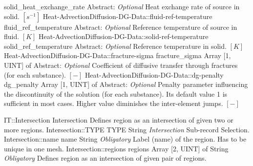 \begin{RecordType}
			{solid{\_}heat{\_}exchange{\_}rate}
			{{Abstract}{: }}
			{ \it{Optional} }
			{{{Heat exchange rate of source in solid. }{$[s^{-1}]$}}}
		\RecKey
			{Heat-AdvectionDiffusion-DG-Data::fluid-ref-temperature}
			{fluid{\_}ref{\_}temperature}
			{{Abstract}{: }}
			{ \it{Optional} }
			{{{Reference temperature of source in fluid. }{$[K]$}}}
		\RecKey
			{Heat-AdvectionDiffusion-DG-Data::solid-ref-temperature}
			{solid{\_}ref{\_}temperature}
			{{Abstract}{: }}
			{ \it{Optional} }
			{{{Reference temperature in solid. }{$[K]$}}}
		\RecKey
			{Heat-AdvectionDiffusion-DG-Data::fracture-sigma}
			{fracture{\_}sigma}
			{{Array [1, UINT] of }{Abstract}{: }}
			{ \it{Optional} }
			{{{Coefficient of diffusive transfer through fractures (for each substance). }{$[-]$}}}
		\RecKey
			{Heat-AdvectionDiffusion-DG-Data::dg-penalty}
			{dg{\_}penalty}
			{{Array [1, UINT] of }{Abstract}{: }}
			{ \it{Optional} }
			{{{Penalty parameter influencing the discontinuity of the solution (for each substance). Its default value 1 is sufficient in most cases. Higher value diminishes the inter-element jumps. }{$[-]$}}}
\end{RecordType}
\begin{RecordType}
	{IT::Intersection}
	{Intersection}
	{} %
	{} %
	{{{Defines region as an intersection of given two or more regions.}}}
		\RecKey
			{Intersection::TYPE}
			{TYPE}
			{{String}}
			{ \it{Intersection} }
			{{{Sub-record Selection.}}}
		\RecKey
			{Intersection::name}
			{name}
			{{String}}
			{ \it{Obligatory} }
			{{{Label (name) of the region. Has to be unique in one mesh.}}}
		\RecKey
			{Intersection::regions}
			{regions}
			{{Array [2, UINT] of }{String}}
			{ \it{Obligatory} }
			{{{Defines region as an intersection of given pair of regions.}}}
\end{RecordType}
